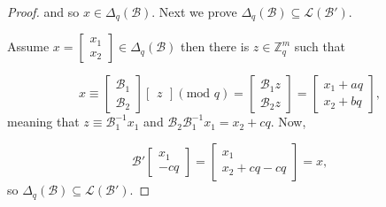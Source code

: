 \documentclass[11pt]{article}
\theoremstyle{definition}
\theoremstyle{plain}
\theoremstyle{remark}
\newcommand{\LL}{\mathcal{L}}
\newcommand{\cB}{\mathcal{B}}
\newcommand{\bZ}{\mathbb{Z}}
\begin{document}
\begin{proof}

and so $x \in \Delta_q(\cB)$. Next we prove $\Delta_q(\cB) \subseteq \LL(\cB')$.

Assume $x = \begin{bmatrix}x_1 \\ x_2 \end{bmatrix}\in \Delta_q(\cB)$ then there is $z \in \bZ_q^m$ such that  

$$x \equiv \begin{bmatrix}
\cB_1\\
\cB_2
\end{bmatrix}
\begin{bmatrix}
z
\end{bmatrix}
(\text{mod } q)
= \begin{bmatrix}
\cB_1 z\\
\cB_2 z
\end{bmatrix}
= \begin{bmatrix}
x_1 + aq\\
x_2 + bq
\end{bmatrix},$$
meaning that $ z \equiv \cB_1^{-1}x_1$ and $\cB_2\cB_1^{-1}x_1 = x_2 + cq$. Now,

$$\cB' \begin{bmatrix}
x_1\\
-cq
\end{bmatrix}
=\begin{bmatrix}
x_1\\
x_2 + cq - cq
\end{bmatrix} = x,$$
so $\Delta_q(\cB) \subseteq \LL(\cB')$.
\end{proof}




\end{document}
